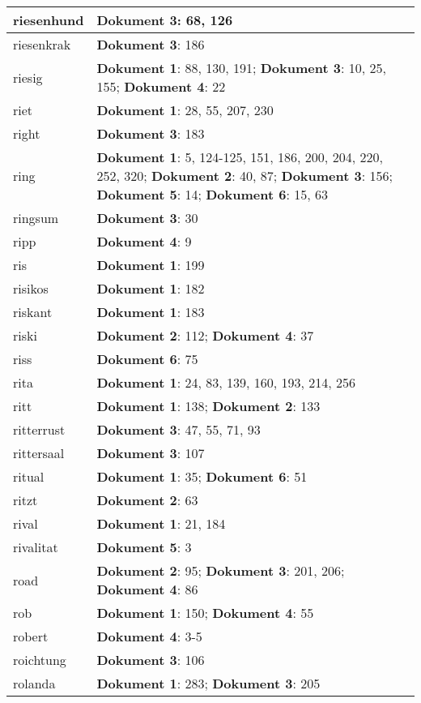 \documentclass[a5paper]{article}
\begin{document}
\begin{longtable}[l]{|l|p{3in}|}
\hline
riesenhund & \textbf{Dokument 3}: 68, 126 \\
\hline
riesenkrak & \textbf{Dokument 3}: 186 \\
\hline
riesig & \textbf{Dokument 1}: 88, 130, 191; \textbf{Dokument 3}: 10, 25, 155; \textbf{Dokument 4}: 22 \\
\hline
riet & \textbf{Dokument 1}: 28, 55, 207, 230 \\
\hline
right & \textbf{Dokument 3}: 183 \\
\hline
ring & \textbf{Dokument 1}: 5, 124-125, 151, 186, 200, 204, 220, 252, 320; \textbf{Dokument 2}: 40, 87; \textbf{Dokument 3}: 156; \textbf{Dokument 5}: 14; \textbf{Dokument 6}: 15, 63 \\
\hline
ringsum & \textbf{Dokument 3}: 30 \\
\hline
ripp & \textbf{Dokument 4}: 9 \\
\hline
ris & \textbf{Dokument 1}: 199 \\
\hline
risikos & \textbf{Dokument 1}: 182 \\
\hline
riskant & \textbf{Dokument 1}: 183 \\
\hline
riski & \textbf{Dokument 2}: 112; \textbf{Dokument 4}: 37 \\
\hline
riss & \textbf{Dokument 6}: 75 \\
\hline
rita & \textbf{Dokument 1}: 24, 83, 139, 160, 193, 214, 256 \\
\hline
ritt & \textbf{Dokument 1}: 138; \textbf{Dokument 2}: 133 \\
\hline
ritterrust & \textbf{Dokument 3}: 47, 55, 71, 93 \\
\hline
rittersaal & \textbf{Dokument 3}: 107 \\
\hline
ritual & \textbf{Dokument 1}: 35; \textbf{Dokument 6}: 51 \\
\hline
ritzt & \textbf{Dokument 2}: 63 \\
\hline
rival & \textbf{Dokument 1}: 21, 184 \\
\hline
rivalitat & \textbf{Dokument 5}: 3 \\
\hline
road & \textbf{Dokument 2}: 95; \textbf{Dokument 3}: 201, 206; \textbf{Dokument 4}: 86 \\
\hline
rob & \textbf{Dokument 1}: 150; \textbf{Dokument 4}: 55 \\
\hline
robert & \textbf{Dokument 4}: 3-5 \\
\hline
roichtung & \textbf{Dokument 3}: 106 \\
\hline
rolanda & \textbf{Dokument 1}: 283; \textbf{Dokument 3}: 205 \\

\end{longtable}
\end{document}
